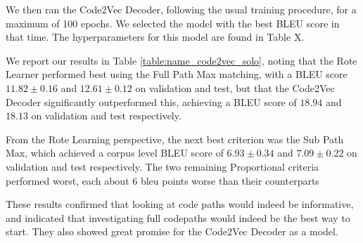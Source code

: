 We then ran the Code2Vec Decoder, following the usual training procedure, for a maximum of 100 epochs.
We selected the model with the best BLEU score in that time.
The hyperparameters for this model are found in Table {X}.

We report our results in Table \ref{table:name_code2vec_solo}, noting that the Rote Learner performed best using the Full Path Max matching, with a BLEU score $ 11.82 \pm  0.16 $ and  $ 12.61 \pm 0.12 $ on validation and test, but that the Code2Vec Decoder significantly outperformed this, achieving a BLEU score of $ 18.94 $ and $ 18.13 $ on validation and test respectively.

From the Rote Learning perspective, the next best criterion was the Sub Path Max, which achieved a corpus level BLEU score of $ 6.93 \pm  0.34 $ and $ 7.09 \pm 0.22 $ on validation and test respectively.  
The two remaining Proportional criteria performed worst, each about 6 bleu points worse than their counterparts

These results confirmed that looking at code paths would indeed be informative, and indicated that investigating full codepaths would indeed be the best way to start. 
They also showed great promise for the Code2Vec Decoder as a model.


